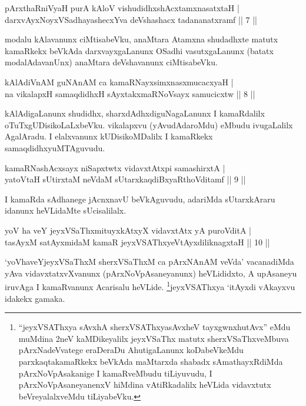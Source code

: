 \begin{shl}
pArxthaRniVyaH purA kAloV vishudidhxshAcx\s \s tamxnasatxtaH | \\
darxvAyxNoyxVSadhayashecxYva deVshashacx tadananatxramf \hfill|| 7 || 
\end{shl}

\begin{artha}
modalu kAlavanunx ciMtisabeVku, anaMtara Atamxna shudadhxte matutx kamaRkekx beVkAda darxvayxgaLanunx OSadhi vasutxgaLanunx (batatx modalAdavanUnx) anaMtara deVshavanunx ciMtisabeVku.
\end{artha}

\begin{shl}
kAlAdiVnAM guNAnAM ca kamaRNayxsimxnasxmucacxyaH | \\
na vikalapxH samaqdidhxH sAyxtakxmaRNoV\s sayx samucicxtw \hfill|| 8 || 
\end{shl}

\begin{artha}
kAlAdigaLanunx shudidhx, sharxdAdhxdiguNagaLanunx I kamaRdalilx oTuTxgUDisikoLaLxbeVku. vikalapxvu (yAvudAdaroMdu) eMbudu ivugaLalilx AgalAradu. I elalxvanunx kUDisikoMDalilx I kamaRkekx samaqdidhxyuMTAguvudu.
\end{artha}


\begin{shl}
kamaRNashAcxsayx niSapxtwtx vidavxtAtx\s pi samashirxtA | \\
yatoV\s taH sUtirxtaM neVdaM sUtarxkaqdiBxyaRthoVditamf \hfill|| 9 || 
\end{shl}

\begin{artha}
I kamaRda sAdhanege jAcnxnavU beVkAguvudu, adariMda sUtarxkAraru idanunx heVLidaMte sUcisalilalx.
\end{artha}

\begin{shl}
yoV ha veY jeyxVSaThxmituyxkAtxyX vidavxtAtx yA puroVditA | \\
tasAyxM satAyxmidaM kamaR jeyxVSAThxyeVtAyxdiliknagxtaH \hfill|| 10 || 
\end{shl}

\begin{artha}
`yoVhaveYjeyxVSaThxM sherxVSaThxM ca pArxNAnAM veVda' vacanadiMda yAva vidavxtatxvXvanunx (pArxNoVpAsaneyanunx) heVLididxto, A upAsaneyu iruvAga I kamaRvanunx Acarisalu heVLide. \footnote{``jeyxVSAThxya sAvxhA sherxVSAThxyasAvxheV tayxgwnxhutAvx'' eMdu muMdina 2neV kaMDikeyalilx jeyxVSaThx matutx sherxVSaThxveMbuva pArxNadeVvatege eraDeraDu AhutigaLanunx koDabeVkeMdu parxkaqtakamaRkekx beVkAda maMtarxda shabadx sAmathayxRdiMda pArxNoVpAsakanige I kamaRveMbudu tiLiyuvudu, I pArxNoVpAsaneyanenxV hiMdina vAtiRkadalilx heVLida vidavxtutx beVreyalalxveMdu tiLiyabeVku.}jeyxVSAThxya `itAyxdi vAkayxvu idakekx gamaka.
\end{artha}

